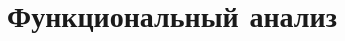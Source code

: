 \documentclass[12pt, a4paper, oneside]{memoir}
\title{Функциональный анализ}
\begin{document}
\begin{titlingpage}
    \maketitle
\end{titlingpage}


\tableofcontents



\end{document}
